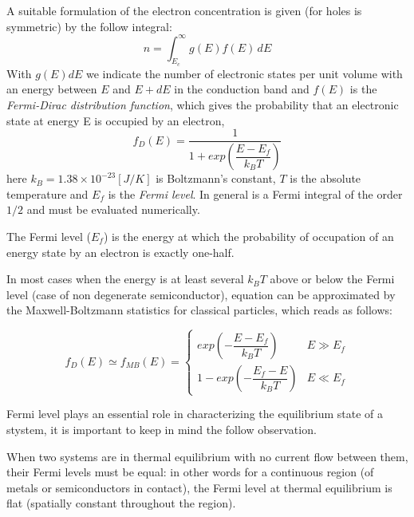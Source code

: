 A suitable formulation of the electron concentration is given (for holes is symmetric) by the follow integral:
\begin{equation}
\label{eq: carrier densiy integral}
n = \int_{E_c}^\infty g(E)f(E) \, dE
\end{equation}
With $g(E)dE$ we indicate the number of electronic states per unit volume with an energy between $E$ and $E+dE$ in the conduction band and $f(E)$ is the \textit{Fermi-Dirac distribution function}, which gives the probability that an electronic state at energy E is occupied by an electron,
\begin{equation}
\label{eq: fermi dirac distribution}
f_D(E) = \dfrac{1}{1+exp\left(\dfrac{E-E_f}{k_BT}\right)} 
\end{equation}
here $k_B=1.38\times10^{-23}[J/K]$ is Boltzmann's constant, $T$ is the absolute temperature and $E_f$ is the \textit{Fermi level}. In general  is a Fermi integral of the order $1/2$ and must be evaluated numerically.
 
\begin{Definizione}
The Fermi level ($E_f$) is the energy at which the probability of occupation of an energy state by an electron is exactly one-half.
\end{Definizione}

In most cases when the energy is at least several $k_BT$ above or below the Fermi level (case of non degenerate semiconductor), equation  can be approximated by the Maxwell-Boltzmann statistics for classical particles, which reads as follows:

\begin{equation}
\label{eq: maxwell distribution}
f_D(E)\simeq f_{MB}(E) = 
\begin{cases}
exp\left(-\dfrac{E-E_f}{k_B T}\right) & E\gg E_f \\
1-exp\left(-\dfrac{E_f-E}{k_BT}\right) & E \ll E_f
\end{cases}
\end{equation}

Fermi level plays an essential role in characterizing the equilibrium state of a stystem, it is important to keep in mind the follow observation.

\begin{Osservazione}
When two systems are in thermal equilibrium with no current flow between them, their Fermi levels must be equal: in other words for a continuous region (of metals or semiconductors in contact), the Fermi level at thermal equilibrium is flat (spatially constant throughout the region).
\end{Osservazione}

